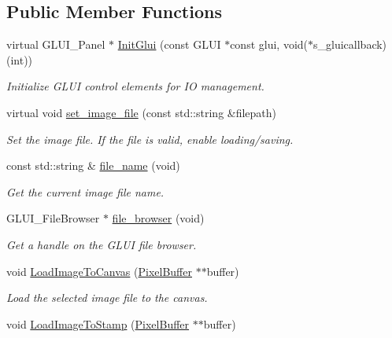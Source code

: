 \subsection*{Public Member Functions}
\begin{DoxyCompactItemize}
\item 
virtual G\+L\+U\+I\+\_\+\+Panel $\ast$ \hyperlink{classimage__tools_1_1IOManager_a5038100a2a640a3343c4715101eec120}{Init\+Glui} (const G\+L\+UI $\ast$const glui, void($\ast$s\+\_\+gluicallback)(int))
\begin{DoxyCompactList}\small\item\em Initialize G\+L\+UI control elements for IO management. \end{DoxyCompactList}\item 
virtual void \hyperlink{classimage__tools_1_1IOManager_a9ddac98843256d25442aba6c963e144a}{set\+\_\+image\+\_\+file} (const std\+::string \&filepath)
\begin{DoxyCompactList}\small\item\em Set the image file. If the file is valid, enable loading/saving. \end{DoxyCompactList}\item 
const std\+::string \& \hyperlink{classimage__tools_1_1IOManager_a667da573afc3fc0977408a0bf669f448}{file\+\_\+name} (void)
\begin{DoxyCompactList}\small\item\em Get the current image file name. \end{DoxyCompactList}\item 
G\+L\+U\+I\+\_\+\+File\+Browser $\ast$ \hyperlink{classimage__tools_1_1IOManager_ab58911faeeb831cc1f62aec390718469}{file\+\_\+browser} (void)
\begin{DoxyCompactList}\small\item\em Get a handle on the G\+L\+UI file browser. \end{DoxyCompactList}\item 
void \hyperlink{classimage__tools_1_1IOManager_a05f34b157208a8d27d6f9d8bf7a20384}{Load\+Image\+To\+Canvas} (\hyperlink{classimage__tools_1_1PixelBuffer}{Pixel\+Buffer} $\ast$$\ast$buffer)\hypertarget{classimage__tools_1_1IOManager_a05f34b157208a8d27d6f9d8bf7a20384}{}\label{classimage__tools_1_1IOManager_a05f34b157208a8d27d6f9d8bf7a20384}

\begin{DoxyCompactList}\small\item\em Load the selected image file to the canvas. \end{DoxyCompactList}\item 
void \hyperlink{classimage__tools_1_1IOManager_a9631b9d5b56b1f9ecfb0f6cf900a5640}{Load\+Image\+To\+Stamp} (\hyperlink{classimage__tools_1_1PixelBuffer}{Pixel\+Buffer} $\ast$$\ast$buffer)\hypertarget{classimage__tools_1_1IOManager_a9631b9d5b56b1f9ecfb0f6cf900a5640}{}\label{classimage__tools_1_1IOManager_a9631b9d5b56b1f9ecfb0f6cf900a5640}


\end{DoxyCompactItemize}
